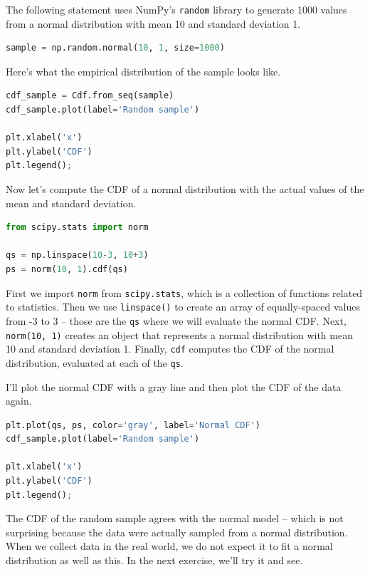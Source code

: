 \documentclass[
]{book}
\newcommand{\passthrough}[1]{#1}
\begin{document}
The following statement uses NumPy's \passthrough{\lstinline!random!}
library to generate 1000 values from a normal distribution with mean 10
and standard deviation 1.

\begin{lstlisting}[language=Python]
sample = np.random.normal(10, 1, size=1000)
\end{lstlisting}

Here's what the empirical distribution of the sample looks like.

\begin{lstlisting}[language=Python]
cdf_sample = Cdf.from_seq(sample)
cdf_sample.plot(label='Random sample')

plt.xlabel('x')
plt.ylabel('CDF')
plt.legend();
\end{lstlisting}

Now let's compute the CDF of a normal distribution with the actual
values of the mean and standard deviation.

\begin{lstlisting}[language=Python]
from scipy.stats import norm

qs = np.linspace(10-3, 10+3)
ps = norm(10, 1).cdf(qs)
\end{lstlisting}

First we import \passthrough{\lstinline!norm!} from
\passthrough{\lstinline!scipy.stats!}, which is a collection of
functions related to statistics. Then we use
\passthrough{\lstinline!linspace()!} to create an array of
equally-spaced values from -3 to 3 -- those are the
\passthrough{\lstinline!qs!} where we will evaluate the normal CDF.
Next, \passthrough{\lstinline!norm(10, 1)!} creates an object that
represents a normal distribution with mean 10 and standard deviation 1.
Finally, \passthrough{\lstinline!cdf!} computes the CDF of the normal
distribution, evaluated at each of the \passthrough{\lstinline!qs!}.

I'll plot the normal CDF with a gray line and then plot the CDF of the
data again.

\begin{lstlisting}[language=Python]
plt.plot(qs, ps, color='gray', label='Normal CDF')
cdf_sample.plot(label='Random sample')

plt.xlabel('x')
plt.ylabel('CDF')
plt.legend();
\end{lstlisting}

The CDF of the random sample agrees with the normal model -- which is
not surprising because the data were actually sampled from a normal
distribution. When we collect data in the real world, we do not expect
it to fit a normal distribution as well as this. In the next exercise,
we'll try it and see.
\end{document}
